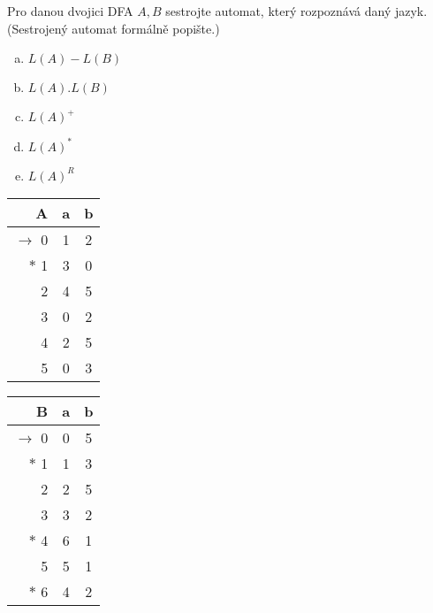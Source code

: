 \documentclass[a4paper,12pt]{amsart}
\begin{document}
\medskip\begin{problem} 
    
    Pro danou dvojici DFA $A,B$ sestrojte automat, který rozpoznává daný jazyk. (Sestrojený automat formálně popište.)
    
    \begin{multicols}{3}

        \begin{enumerate}[(a)]\setlength\itemsep{6pt}
            \item $L(A)-L(B)$
            \item $L(A).L(B)$
            \item $L(A)^+$
            \item $L(A)^*$
            \item $L(A)^R$
        \end{enumerate}

        \begin{tabular}{ r | c c }
            A & a & b \\ \hline
            $\to$ 0 & 1 & 2 \\  
            $\ast$ 1 & 3 & 0 \\
            2 & 4 & 5 \\
            3 & 0 & 2 \\
            4 & 2 & 5 \\
            5 & 0 & 3
        \end{tabular}    
        
        \begin{tabular}{ r | c c }
            B & a & b \\ \hline
            $\to$ 0 & 0 & 5 \\  
            $\ast$ 1 & 1 & 3 \\
            2 & 2 & 5 \\
            3 & 3 & 2 \\
            $\ast$ 4 & 6 & 1 \\
            5 & 5 & 1 \\
            $\ast$ 6 & 4 & 2
        \end{tabular}

    \end{multicols}
    
\end{problem}
\end{document}
